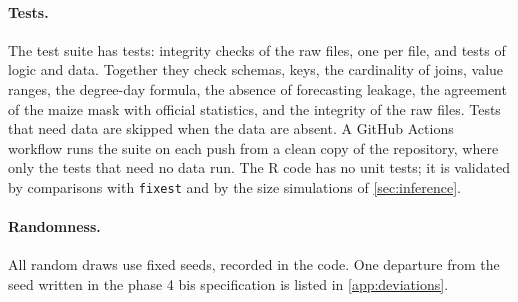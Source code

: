 \paragraph{Tests.} The test suite has \TestCount{} tests: \TestIntegrity{} integrity checks of the raw files, one per file, and \TestLogic{} tests of logic and data. Together they check schemas, keys, the cardinality of joins, value ranges, the degree-day formula, the absence of forecasting leakage, the agreement of the maize mask with official statistics, and the integrity of the raw files. Tests that need data are skipped when the data are absent. A GitHub Actions workflow runs the suite on each push from a clean copy of the repository, where only the tests that need no data run. The R code has no unit tests; it is validated by comparisons with \texttt{fixest} and by the size simulations of \cref{sec:inference}.

\paragraph{Randomness.} All random draws use fixed seeds, recorded in the code. One departure from the seed written in the phase 4 bis specification is listed in \cref{app:deviations}.
